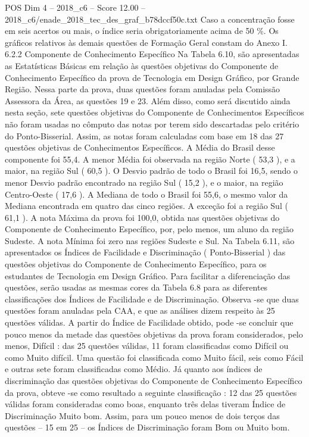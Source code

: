\begin{textsample}{POS Dim 4 – 2018\_c6 – Score 12.00 – 2018\_c6/enade\_2018\_tec\_des\_graf\_b78dccf50c.txt}
Caso a concentração fosse em seis acertos ou mais, o índice seria obrigatoriamente acima de 50 \%.
Os gráficos relativos às demais questões de Formação Geral constam do Anexo I. 6.2.2 Componente de Conhecimento Específico Na Tabela 6.10, são apresentadas as Estatísticas Básicas em relação às questões objetivas do Componente de Conhecimento Específico da prova de Tecnologia em Design Gráfico, por Grande Região.
Nessa parte da prova, duas questões foram anuladas pela Comissão Assessora da Área, as questões 19 e 23.
Além disso, como será discutido ainda nesta seção, sete questões objetivas do Componente de Conhecimentos Específicos não foram usadas no cômputo das notas por terem sido descartadas pelo critério do Ponto-Bisserial.
Assim, as notas foram calculadas com base em 18 das 27 questões objetivas de Conhecimentos Específicos.
A Média do Brasil desse componente foi 55,4.
A menor Média foi observada na região Norte ( 53,3 ), e a maior, na região Sul ( 60,5 ).
O Desvio padrão de todo o Brasil foi 16,5, sendo o menor Desvio padrão encontrado na região Sul ( 15,2 ), e o maior, na região Centro-Oeste ( 17,6 ).
A Mediana de todo o Brasil foi 55,6, o mesmo valor da Mediana encontrada em quatro das cinco regiões.
A exceção foi a região Sul ( 61,1 ).
A nota Máxima da prova foi 100,0, obtida nas questões objetivas do Componente de Conhecimento Específico, por, pelo menos, um aluno da região Sudeste.
A nota Mínima foi zero nas regiões Sudeste e Sul.
Na Tabela 6.11, são apresentados os Índices de Facilidade e Discriminação ( Ponto-Bisserial ) das questões objetivas do Componente de Conhecimento Específico, para os estudantes de Tecnologia em Design Gráfico.
Para facilitar a diferenciação das questões, serão usadas as mesmas cores da Tabela 6.8 para as diferentes classificações dos Índices de Facilidade e de Discriminação.
Observa -se que duas questões foram anuladas pela CAA, e que as análises dizem respeito às 25 questões válidas.
A partir do Índice de Facilidade obtido, pode -se concluir que pouco menos da metade das questões objetivas da prova foram considerados, pelo menos, Difícil : das 25 questões válidas, 11 foram classificadas como Difícil ou como Muito difícil.
Uma questão foi classificada como Muito fácil, seis como Fácil e outras sete foram classificadas como Médio.
Já quanto aos índices de discriminação das questões objetivas do Componente de Conhecimento Específico da prova, obteve -se como resultado a seguinte classificação : 12 das 25 questões válidas foram consideradas como boas, enquanto três delas tiveram Índice de Discriminação Muito bom.
Assim, para um pouco menos de dois terços das questões – 15 em 25 – os Índices de Discriminação foram Bom ou Muito bom.

\end{textsample}
